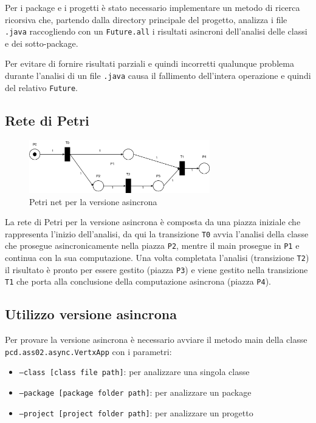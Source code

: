 \documentclass[11pt,notitlepage]{article}
\begin{document}
Per i package e i progetti è stato necessario implementare un metodo di ricerca ricorsiva che, partendo dalla directory principale del progetto, analizza i file \texttt{.java}
raccogliendo con un \texttt{Future.all} i risultati asincroni dell'analisi delle classi e dei sotto-package.

Per evitare di fornire risultati parziali e quindi incorretti qualunque problema durante l'analisi di un file \texttt{.java} causa il fallimento dell'intera operazione 
e quindi del relativo \texttt{Future}.

\subsection{Rete di Petri}

\begin{figure}[H]
    \centering
    \includegraphics[width=0.7\textwidth]{Petri_async.png}
    \caption{Petri net per la versione asincrona}
    \label{fig:rete-petri-asincrona}
\end{figure}

La rete di Petri per la versione asincrona è composta da una piazza iniziale che rappresenta l'inizio dell'analisi, da qui la transizione \texttt{T0} avvia l'analisi della classe
che prosegue asincronicamente nella piazza \texttt{P2}, mentre il main prosegue in \texttt{P1} e continua con la sua computazione. Una volta completata l'analisi 
(transizione \texttt{T2}) il risultato è pronto per essere gestito (piazza \texttt{P3}) e viene gestito nella transizione \texttt{T1} che porta alla conclusione 
della computazione asincrona (piazza \texttt{P4}).

\subsection{Utilizzo versione asincrona}
Per provare la versione asincrona è necessario avviare il metodo main della classe \texttt{pcd.ass02.async.VertxApp} con i parametri:
\begin{itemize}
    \item \texttt{--class [class file path]}: per analizzare una singola classe
    \item \texttt{--package [package folder path]}: per analizzare un package
    \item \texttt{--project [project folder path]}: per analizzare un progetto
\end{itemize}
\end{document}
